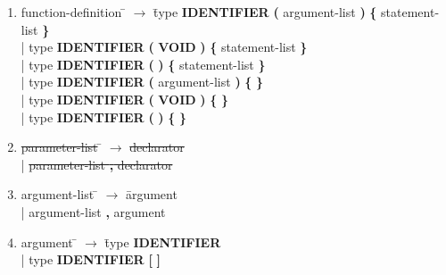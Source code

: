 \begin{enumerate}
\item \begin{tabbing} function-definition \= $\rightarrow$ \= type \textbf{IDENTIFIER} \textbf{(} argument-list \textbf{)} \textbf{\{} statement-list \textbf{\}}   \\
	\> \hspace*{0.05cm} 	|\>  type \textbf{IDENTIFIER} \textbf{(} \textbf{VOID} \textbf{)}          \textbf{\{} statement-list \textbf{\}}   \\
	\> \hspace*{0.05cm} 	|\>  type \textbf{IDENTIFIER} \textbf{(} \textbf{)}               \textbf{\{} statement-list \textbf{\}}   \\
	\> \hspace*{0.05cm} 	|\>  type \textbf{IDENTIFIER} \textbf{(} argument-list \textbf{)} \textbf{\{}                \textbf{\}}   \\
	\> \hspace*{0.05cm} 	|\>  type \textbf{IDENTIFIER} \textbf{(} \textbf{VOID} \textbf{)}          \textbf{\{}                \textbf{\}}   \\
	\> \hspace*{0.05cm} 	|\>  type \textbf{IDENTIFIER} \textbf{(} \textbf{)}               \textbf{\{}                \textbf{\}}   \\
\end{tabbing}

\item \begin{tabbing} \sout{parameter-list} \= $\rightarrow$ \= \sout{declarator} \\
	\> \hspace*{0.05cm} | \> \sout{parameter-list \textbf{,} declarator} \\
\end{tabbing}

\item \begin{tabbing} argument-list \= $\rightarrow$ \= argument \\
	\> \hspace*{0.05cm} | \> argument-list \textbf{,} argument
\end{tabbing}

\item \begin{tabbing} argument \= $\rightarrow$ \= type \textbf{IDENTIFIER} \\
	\> \hspace*{0.05cm} | \> type \textbf{IDENTIFIER} \textbf{[} \textbf{]} \\
\end{tabbing}


\end{enumerate}

